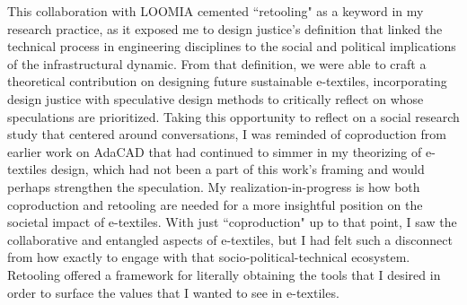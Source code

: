 This collaboration with LOOMIA cemented ``retooling" as a keyword in my research practice, as it exposed me to design justice's definition that linked the technical process in engineering disciplines to the social and political implications of the infrastructural dynamic. From that definition, we were able to craft a theoretical contribution on designing future sustainable e-textiles, incorporating design justice with speculative design methods to critically reflect on whose speculations are prioritized. 
Taking this opportunity to reflect on a social research study that centered around conversations, I was reminded of coproduction from earlier work on AdaCAD that had continued to simmer in my theorizing of e-textiles design, which had not been a part of this work's framing and would perhaps strengthen the speculation. My realization-in-progress is how both coproduction and retooling are needed for a more insightful position on the societal impact of e-textiles. With just ``coproduction" up to that point, I saw the collaborative and entangled aspects of e-textiles, but I had felt such a disconnect from how exactly to engage with that socio-political-technical ecosystem. Retooling offered a framework for literally obtaining the tools that I desired in order to surface the values that I wanted to see in e-textiles.
